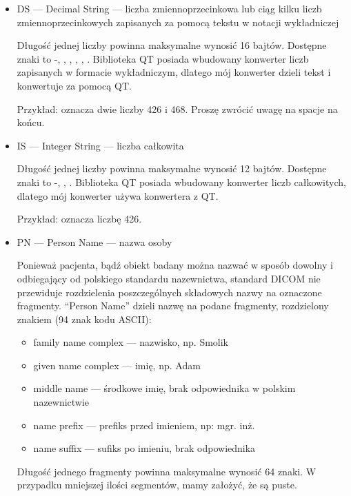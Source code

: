 \begin{itemize}
    \item DS --- Decimal String --- liczba zmiennoprzecinkowa lub ciąg kilku liczb zmiennoprzecinkowych zapisanych za pomocą tekstu w notacji wykładniczej

          Długość jednej liczby powinna maksymalne wynosić 16 bajtów.
          Dostępne znaki to -, \dataword{+}, \dataword{-}, , , .
          Biblioteka QT posiada wbudowany konwerter liczb zapisanych w formacie wykładniczym, dlatego mój konwerter dzieli tekst i konwertuje za pomocą QT.

          Przykład:  oznacza dwie liczby 426 i 468. Proszę zwrócić uwagę na spacje na końcu.

    \item IS --- Integer String --- liczba całkowita

          Długość jednej liczby powinna maksymalne wynosić 12 bajtów.
          Dostępne znaki to -, \dataword{+}, \dataword{-}.
          Biblioteka QT posiada wbudowany konwerter liczb całkowitych, dlatego mój konwerter używa konwertera z QT.

          Przykład:   oznacza liczbę 426.

    \item PN --- Person Name --- nazwa osoby

          Ponieważ pacjenta, bądź obiekt badany można nazwać w sposób dowolny i odbiegający od polskiego standardu nazewnictwa, standard DICOM nie przewiduje rozdzielenia poszczególnych składowych nazwy na oznaczone fragmenty.
          \enquote{Person Name} dzieli nazwę na podane fragmenty, rozdzielony znakiem \dataword{\^{}} (94 znak kodu ASCII):
          \begin{itemize}
              \item family name complex --- nazwisko, np. Smolik
              \item given name complex --- imię, np. Adam
              \item middle name --- środkowe imię, brak odpowiednika w polskim nazewnictwie
              \item name prefix --- prefiks przed imieniem, np: mgr. inż.
              \item name suffix --- sufiks po imieniu, brak odpowiednika
          \end{itemize}
          Długość jednego fragmenty powinna maksymalne wynosić 64 znaki.
          W przypadku mniejszej ilości segmentów, mamy założyć, że są puste.


\end{itemize}
